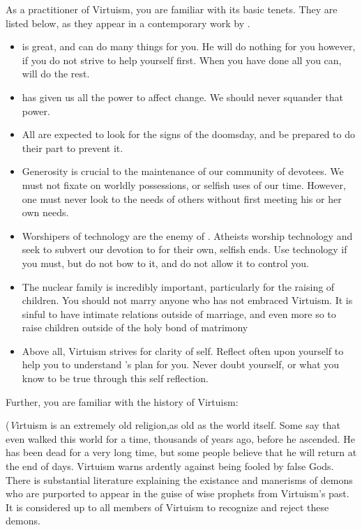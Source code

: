 \documentclass[blue]{guildcamp1}
\begin{document}
\name{\bVirtuism{}}

As a practitioner of Virtuism, you are familiar with its basic tenets. They are listed below, as they appear in a contemporary work by \cPastor{\MYname{}}.

\begin{itemize}
  \item \cGod{\MYname{}} is great, and can do many things for you. He will do nothing for you however, if you do not strive to help yourself first. When you have done all you can, \cGod{\MYname{}} will do the rest.
  
  \item \cGod{\MYname{}} has given us all the power to affect change. We should never squander that power. 
  
  \item All are expected to look for the signs of the doomsday, and be prepared to do their part to prevent it. 
  
  \item Generosity is crucial to the maintenance of our community of devotees. We must not fixate on worldly possessions, or selfish uses of our time. However, one must never look to the needs of others without first meeting his or her own needs.
  
  \item Worshipers of technology are the enemy of \cGod{}. Atheists worship technology and seek to subvert our devotion to \cGod{} for their own, selfish ends. Use technology if you must, but do not bow to it, and do not allow it to control you.
  
  \item The nuclear family is incredibly important, particularly for the raising of children. You should not marry anyone who has not embraced Virtuism. It is sinful to have intimate relations outside of marriage, and even more so to raise children outside of the holy bond of matrimony
  
  \item Above all, Virtuism strives for clarity of self. Reflect often upon yourself to help you to understand \cGod{}'s plan for you. Never doubt yourself, or what you know to be true through this self reflection.
\end{itemize}

Further, you are familiar with the history of Virtuism:

(\emph Virtuism is an extremely old religion,as old as the world itself. Some say that \cGod{} even walked this world for a time, thousands of years ago, before he ascended. He has been dead for a very long time, but some people believe that he will return at the end of days. Virtuism warns ardently against being fooled by false Gods. There is substantial literature explaining the existance and manerisms of demons who are purported to appear in the guise of wise prophets from Virtuism's past. It is considered up to all members of Virtuism to recognize and reject these demons.
\end{document}
